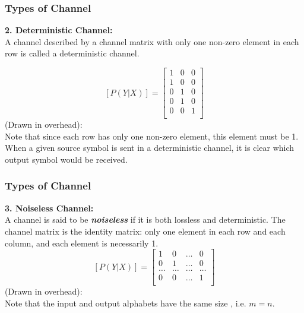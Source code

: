 \documentclass[a4]{beamer}
\begin{document}
\begin{frame}
\frametitle{Types of Channel}
\textbf{2. Deterministic Channel:}\\
A channel described by a channel matrix with only one non-zero element in each row is called a deterministic channel.

\[  [P(Y|X)]  =  \left[ \begin{array}{ccc}
1   & 0 &0 \\
1  & 0 &0\\
0  & 1 &0\\
0  & 1& 0 \\
0  & 0& 1 \\
\end{array} \right]  \]
(Drawn in overhead):\\ \bigskip
Note that since each row has only one non-zero element, this element must be 1. When a given source symbol is sent in a deterministic channel, it is clear which output symbol would be received.
\end{frame}

\begin{frame}
\frametitle{Types of Channel}
\textbf{3. Noiseless Channel:}\\
A channel is said to be \emph{\textbf{noiseless}} if it is both lossless and deterministic.
The channel matrix is the identity matrix: only one element in each row and each column, and each element is necessarily 1.
\[  [P(Y|X)]  = \left[ \begin{array}{cccc}
1 &0 & \ldots & 0 \\
0 & 1& \ldots & 0 \\
\ldots & \ldots & \ldots & \ldots \\
0& 0 & \ldots & 1 \\
\end{array} \right] \]
(Drawn in overhead):\\ \bigskip
Note that the input and output alphabets have the same size , i.e. $m=n$.
\end{frame}
\end{document}
